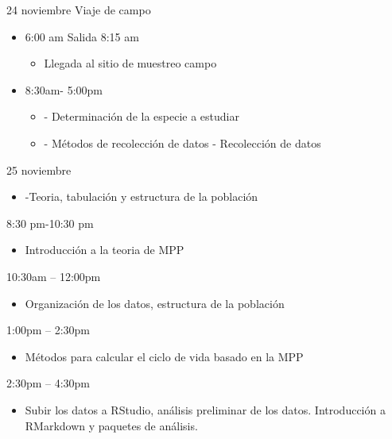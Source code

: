\documentclass[
]{book}
\providecommand{\tightlist}{%
  \setlength{\itemsep}{0pt}\setlength{\parskip}{0pt}}
\theoremstyle{definition}
\theoremstyle{definition}
\theoremstyle{definition}
\theoremstyle{definition}
\theoremstyle{remark}
\begin{document}
24 noviembre Viaje de campo

\begin{itemize}
\item
  6:00 am Salida 8:15 am

  \begin{itemize}
  \tightlist
  \item
    Llegada al sitio de muestreo campo
  \end{itemize}
\item
  8:30am- 5:00pm

  \begin{itemize}
  \item
    - Determinación de la especie a estudiar
  \item
    - Métodos de recolección de datos - Recolección de datos
  \end{itemize}
\end{itemize}

25 noviembre

\begin{itemize}
\tightlist
\item
  -Teoria, tabulación y estructura de la población
\end{itemize}

8:30 pm-10:30 pm

\begin{itemize}
\tightlist
\item
  Introducción a la teoria de MPP
\end{itemize}

10:30am -- 12:00pm

\begin{itemize}
\tightlist
\item
  Organización de los datos, estructura de la población
\end{itemize}

1:00pm -- 2:30pm

\begin{itemize}
\tightlist
\item
  Métodos para calcular el ciclo de vida basado en la MPP
\end{itemize}

2:30pm -- 4:30pm

\begin{itemize}
\tightlist
\item
  Subir los datos a RStudio, análisis preliminar de los datos.
  Introducción a RMarkdown y paquetes de análisis.
\end{itemize}
\end{document}
